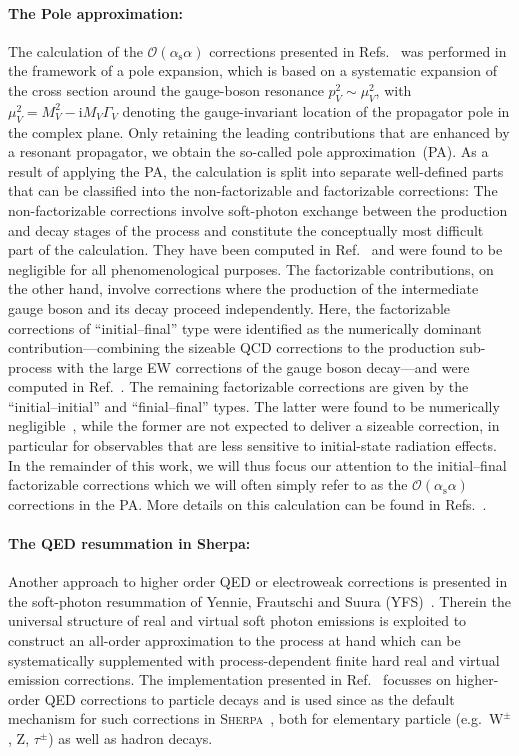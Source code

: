 \documentclass[11pt]{cernrep}
\newcommand{\order}{\ensuremath{\mathcal{O}}}
\newcommand{\alphas}{\ensuremath{\alpha_\mathrm{s}}}
\newcommand{\ri}{\ensuremath{\mathrm{i}}} %
\DeclareRobustCommand{\PZ}{{\ensuremath{\mathrm{Z}}}}
\DeclareRobustCommand{\PWpm}{{\ensuremath{\mathrm{W}^{\pm}}}}
\begin{document}
\paragraph{The Pole approximation:}
The calculation of the $\order(\alphas\alpha)$ corrections presented in Refs.~\cite{Dittmaier:2014qza,Dittmaier:2015rxo} was performed in the framework of a pole expansion, which is based on a systematic expansion of the cross section around the gauge-boson resonance $p_V^2\sim\mu_V^2$, with $\mu_V^2=M_V^2-\ri M_V\Gamma_V$ denoting the gauge-invariant location of the propagator pole in the complex plane. 
Only retaining the leading contributions that are enhanced by a resonant propagator, we obtain the so-called pole approximation~(PA).
As a result of applying the PA, the calculation is split into separate well-defined parts that can be classified into the non-factorizable and factorizable corrections: 
The non-factorizable corrections involve soft-photon exchange between the production and decay stages of the process and constitute the conceptually most difficult part of the calculation.
They have been computed in Ref.~\cite{Dittmaier:2014qza} and were found to be negligible for all phenomenological purposes.
The factorizable contributions, on the other hand, involve corrections where the production of the intermediate gauge boson and its decay proceed independently. 
Here, the factorizable corrections of ``initial--final'' type were identified as the numerically dominant contribution---combining the sizeable QCD corrections to the production sub-process with the large EW corrections of the gauge boson decay---and were computed in Ref.~\cite{Dittmaier:2015rxo}.
The remaining factorizable corrections are given by the ``initial--initial'' and ``finial--final'' types.
The latter were found to be numerically negligible~\cite{Dittmaier:2015rxo}, while the former are not expected to deliver a sizeable correction, in particular for observables that are less sensitive to initial-state radiation effects.
In the remainder of this work, we will thus focus our attention to the initial--final factorizable corrections which we will often simply refer to as the $\order(\alphas\alpha)$ corrections in the PA.
More details on this calculation can be found in Refs.~\cite{Dittmaier:2014qza,Dittmaier:2015rxo}.

\paragraph{The QED resummation in Sherpa:}
Another approach to higher order QED or electroweak corrections is 
presented in the soft-photon resummation of Yennie, Frautschi and 
Suura (YFS)~\cite{Yennie:1961ad}. Therein the universal structure 
of real and virtual soft photon emissions is exploited to construct 
an all-order approximation to the process at hand which can be 
systematically supplemented with process-dependent finite hard 
real and virtual emission corrections. The implementation presented 
in Ref.~\cite{Schonherr:2008av} focusses on higher-order QED corrections 
to particle decays and is used since as the default mechanism for such 
corrections in \textsc{Sherpa}~\cite{Gleisberg:2008ta}, both for 
elementary particle (e.g.\ $\PWpm$, $\PZ$, $\tau^\pm$) as well as 
hadron decays. 
\end{document}
